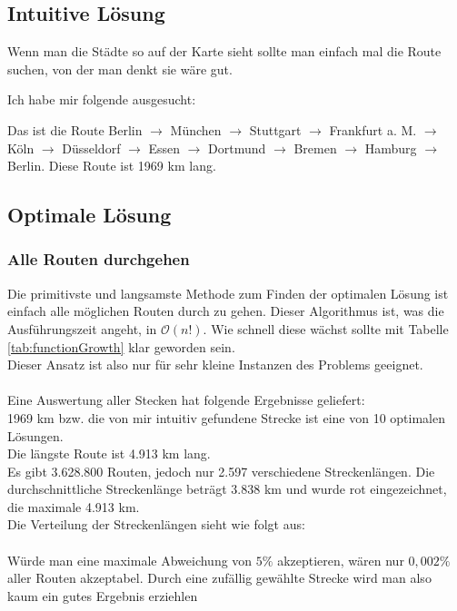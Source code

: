 \documentclass[a4paper,9pt]{scrartcl}
\begin{document}
  \subsection{Intuitive Lösung}
    Wenn man die Städte so auf der Karte sieht sollte man einfach mal die Route 
    suchen, von der man denkt sie wäre gut. \\
    \begin{center}
    \end{center}
    Ich habe mir folgende ausgesucht:\\
    \begin{center}
    \end{center}
    Das ist die Route Berlin $\rightarrow$ München $\rightarrow$ Stuttgart 
    $\rightarrow$ Frankfurt a. M. $\rightarrow$ Köln $\rightarrow$ Düsseldorf 
    $\rightarrow$ Essen $\rightarrow$ Dortmund $\rightarrow$ Bremen 
    $\rightarrow$ Hamburg $\rightarrow$ Berlin. 
    Diese Route ist 1969 km lang. 

  \newpage
  \subsection{Optimale Lösung}
  \subsubsection{Alle Routen durchgehen}
    Die primitivste und langsamste Methode zum Finden der optimalen Lösung ist 
    einfach alle möglichen Routen durch zu gehen. Dieser Algorithmus ist, was 
    die Ausführungszeit angeht, in $\mathcal{O}(n!)$. Wie schnell diese wächst 
    sollte mit Tabelle \ref{tab:functionGrowth} klar geworden sein.\\
    Dieser Ansatz ist also nur für sehr kleine Instanzen des Problems geeignet.\\
    \\
    Eine Auswertung aller Stecken hat folgende Ergebnisse geliefert: \\
    1969 km bzw. die von mir intuitiv gefundene Strecke ist eine von 10 optimalen Lösungen.\\
    Die längste Route ist 4.913 km lang.\\
    Es gibt 3.628.800 Routen, jedoch nur 2.597 verschiedene Streckenlängen. Die
    durchschnittliche Streckenlänge beträgt 3.838 km und wurde rot eingezeichnet,
    die maximale 4.913 km.\\
    Die Verteilung der Streckenlängen sieht wie folgt aus:\\
    \\
    Würde man eine maximale Abweichung von $5\%$ akzeptieren, wären nur $0,002\%$
    aller Routen akzeptabel. Durch eine zufällig gewählte Strecke wird man also 
    kaum ein gutes Ergebnis erziehlen
\end{document}

